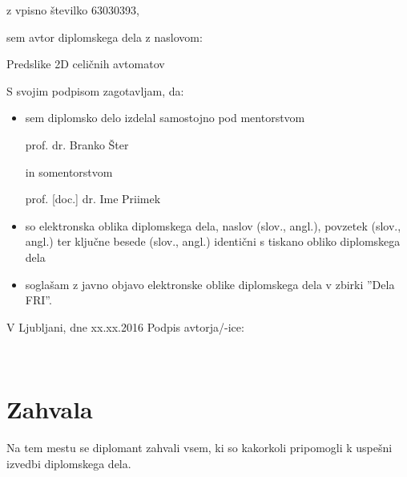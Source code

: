 \documentclass[12pt,a4paper,openany]{book}
\begin{document}
\vspace{0.5cm}
z vpisno številko \hspace{0.5cm} 63030393,

\vspace{1cm}
sem avtor diplomskega dela z naslovom:
   
\vspace{0.5cm}
Predslike 2D celičnih avtomatov

\vspace{1.5cm}
S svojim podpisom zagotavljam, da:
\begin{itemize}
	\item sem diplomsko delo izdelal samostojno pod mentorstvom 
	
	prof. dr. Branko Šter
	
	in somentorstvom 
	
	prof. [doc.] dr. Ime Priimek
	
	\item so elektronska oblika diplomskega dela, naslov (slov., angl.), povzetek (slov., angl.) ter ključne besede (slov., angl.) identični s tiskano obliko diplomskega dela
	\item soglašam z javno objavo elektronske oblike diplomskega dela v zbirki ''Dela FRI''.
\end{itemize}

\vspace{1cm}
V Ljubljani, dne xx.xx.2016 \hspace{1cm} Podpis avtorja/-ice:

\newpage 


\ \thispagestyle{empty}

\newpage



\chapter*{Zahvala}

\thispagestyle{empty}

Na tem mestu se diplomant zahvali vsem, ki so kakorkoli pripomogli k uspešni izvedbi diplomskega dela.


\newpage

\end{document}
